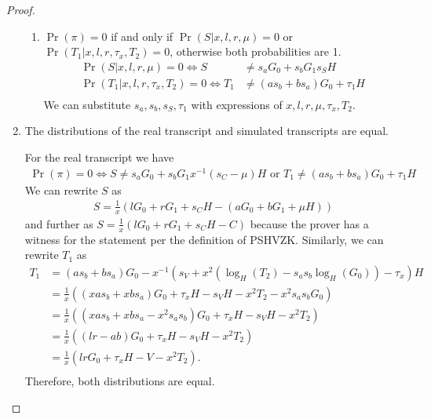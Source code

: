 \begin{proof}
\begin{enumerate}
\begin{innerproof}
\begin{enumerate}
     \item $\Pr(\pi) = 0$ if and only if $\Pr(S| x, l, r, \mu) = 0$ or $\Pr(T_1| x, l, r, \tau_x, T_2) = 0$, otherwise both probabilities are 1.
       \begin{align*}
       \Pr(S| x, l, r, \mu) = 0 \Leftrightarrow S &\ne s_aG_0 + s_bG_1 s_SH\\
       \Pr(T_1| x, l, r, \tau_x, T_2) = 0 \Leftrightarrow T_1 &\ne (as_b + bs_a)G_0 + \tau_1H\\
       \end{align*}
       We can substitute $s_a, s_b, s_S, \tau_1$ with expressions of $x, l, r, \mu, \tau_x, T_2$.
     \end{enumerate}
    \end{innerproof}
  \item The distributions of the real transcript and simulated transcripts are equal.
  \begin{innerproof}
    For the real transcript we have
    \begin{align*}
      \Pr(\pi) = 0 \Leftrightarrow S \ne s_aG_0 + s_bG_1 x^{-1}(s_C - \mu)H \text{ or } T_1 \ne (as_b + bs_a)G_0 + \tau_1H
      \end{align*}
      We can rewrite $S$ as
      \begin{align*}
        S = \frac{1}{x}(lG_0 + rG_1 + s_CH - (aG_0 + bG_1 + \mu H))
      \end{align*}
      and further as $S = \frac{1}{x}(lG_0 + rG_1 + s_CH - C)$ because the prover has a witness for the statement per the definition of PSHVZK.
      Similarly, we can rewrite $T_1$ as
      \begin{align*}
        T_1 &= (as_b + bs_a)G_0 - x^{-1}(s_V  + x^2(\log_H(T_2) - s_as_b\log_H(G_0)) - \tau_x)H\\
            &= \frac{1}{x}((xas_b + xbs_a)G_0 + \tau_xH - s_VH - x^2T_2 - x^2s_as_bG_0)\\
            &= \frac{1}{x}((xas_b + xbs_a - x^2s_as_b)G_0 + \tau_xH - s_VH - x^2T_2)\\
            &= \frac{1}{x}((lr - ab)G_0 + \tau_xH - s_VH - x^2T_2)\\
            &= \frac{1}{x}(lr G_0 + \tau_xH - V - x^2T_2).\\
      \end{align*}
      Therefore, both distributions are equal.
  \end{innerproof}
 \end{enumerate}
\end{proof}

